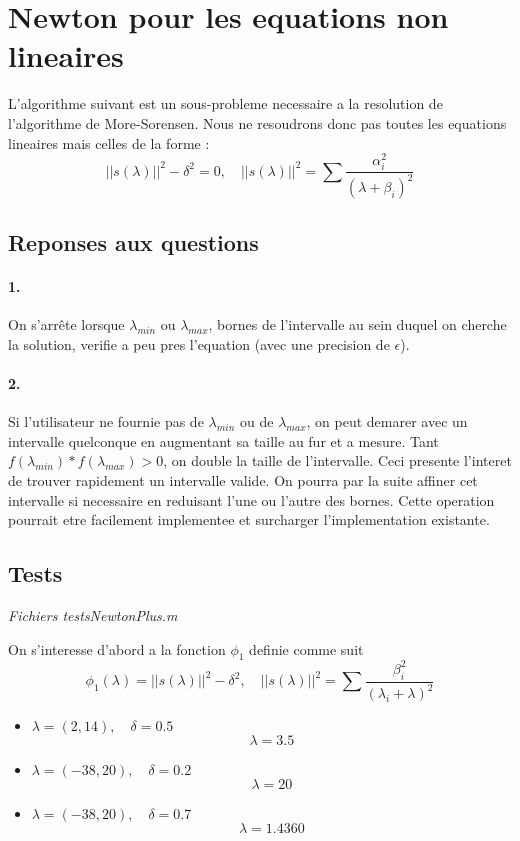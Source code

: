 \documentclass[12pt]{article}
\begin{document}
\section{Newton pour les equations non lineaires}
L'algorithme suivant est un sous-probleme necessaire a la resolution de l'algorithme de More-Sorensen. Nous ne resoudrons donc pas toutes les equations lineaires mais celles de la forme : \[||s(\lambda)||^2 - \delta^2 = 0,\quad ||s(\lambda)||^2 = \sum{\frac{\alpha_i^2}{(\lambda + \beta_i)^2}}\]


\subsection{Reponses aux questions}
\paragraph{1.}
On s'arrête lorsque $\lambda_{min}$ ou $\lambda_{max}$, bornes de l'intervalle au sein duquel on cherche la solution, verifie a peu pres l'equation (avec une precision de $\epsilon$).
\paragraph{2.}
Si l'utilisateur ne fournie pas de $\lambda_{min}$ ou de $\lambda_{max}$, on peut demarer avec un intervalle quelconque en augmentant sa taille au fur et a mesure. Tant $f(\lambda_{min}) * f(\lambda_{max}) > 0$, on double la taille de l'intervalle. Ceci presente l'interet de trouver rapidement un intervalle valide. On pourra par la suite affiner cet intervalle si necessaire en reduisant l'une ou l'autre des bornes.\newline
Cette operation pourrait etre facilement implementee et surcharger l'implementation existante.

\subsection{Tests}
\begin{flushright}
\textit{Fichiers testsNewtonPlus.m}
\end{flushright}
On s'interesse d'abord a la fonction $\phi_1$ definie comme suit
	\[\phi_1(\lambda) = ||s(\lambda)||^2 - \delta^2,\quad ||s(\lambda)||^2 = \sum{\frac{\beta_i^2}{(\lambda_i + \lambda)^2}}\]
\begin{itemize}
	\item $\lambda = (2, 14), \quad \delta = 0.5$
		\[\lambda = 3.5\]
	\item $\lambda = (-38, 20), \quad \delta = 0.2$
		\[\lambda = 20\]
	\item $\lambda = (-38, 20),\quad \delta = 0.7$
		\[\lambda = 1.4360\]
\end{itemize}
\end{document}
